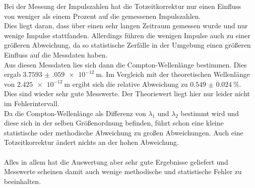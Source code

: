 \noindent Bei der Messung der Impulszahlen hat die Totzeitkorrektur nur einen Einfluss von weniger als einem Prozent auf die gemessenen Impulszahlen. \\
Dies liegt daran, dass über einen sehr langen Zeitraum gemessen wurde und nur wenige Impulse stattfanden. 
Allerdings führen die wenigen Impulse auch zu einer größeren Abweichung, da so statistische Zerfälle in der Umgebung einen größeren Einfluss auf die Messdaten haben.\\
Aus diesen Messdaten lies sich dann die Compton-Wellenlänge bestimmen. Dies ergab $\SI{3.7593(0590)e-12}{\meter}$.
Im Vergleich mit der theoretischen Wellenlänge von $\SI{2.425e-12}{\meter}$ ergibt sich die relative Abweichung zu $\SI{0.549(0024)}{\percent}$. \\
Dies sind wieder sehr gute Messwerte. Der Theoriewert liegt hier nur leider nicht im Fehlerintervall.\\
Da die Compton-Wellenlänge als Differenz von $\lambda_1$ und $\lambda_2$ bestimmt wird und diese sich in der selben Größenordnung befinden, führt schon eine kleine statistische oder methodische Abweichung zu großen Abweichungen.
Auch eine Totzeitkorrektur ändert nichts an der hohen Abweichung.\\\\
\noindent
Alles in allem hat die Auswertung aber sehr gute Ergebnisse geliefert und Messwerte scheinen damit auch wenige methodische und statistische Fehler zu beeinhalten.